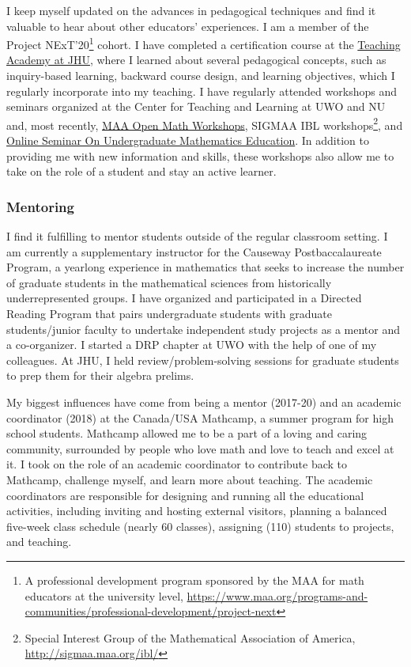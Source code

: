 \documentclass[
]{report}
\begin{document}
I keep myself updated on the advances in pedagogical techniques and find it valuable to hear about other educators' experiences. I am a member of the Project NExT'20\footnote{A professional development program sponsored by the MAA for math educators at the university level, \url{https://www.maa.org/programs-and-communities/professional-development/project-next}} cohort. I have completed a certification course at the \href{https://ctei.jhu.edu/teaching-academy}{Teaching Academy at JHU}, where I learned about several pedagogical concepts, such as inquiry-based learning, backward course design, and learning objectives, which I regularly incorporate into my teaching. I have regularly attended workshops and seminars organized at the Center for Teaching and Learning at UWO and NU and, most recently, \href{https://www.maa.org/programs-and-communities/professional-development/open-math}{MAA Open Math Workshops}, SIGMAA IBL workshops\footnote{Special Interest Group of the Mathematical Association of America, \url{http://sigmaa.maa.org/ibl/}}, and \href{https://olsume.org/}{Online Seminar On Undergraduate Mathematics Education}.
In addition to providing me with new information and skills, these workshops also allow me to take on the role of a student and stay an active learner.

\hypertarget{mentoring}{%
\subsubsection*{Mentoring}\label{mentoring}}


I find it fulfilling to mentor students outside of the regular classroom setting.
I am currently a supplementary instructor for the Causeway Postbaccalaureate Program, a yearlong experience in mathematics that seeks to increase the number of graduate students in the mathematical sciences from historically underrepresented groups. I have organized and participated in a Directed Reading Program that pairs undergraduate students with graduate students/junior faculty to undertake independent study projects as a mentor and a co-organizer. I started a DRP chapter at UWO with the help of one of my colleagues. At JHU, I held review/problem-solving sessions for graduate students to prep them for their algebra prelims.

My biggest influences have come from being a mentor (2017-20) and an academic coordinator (2018) at the Canada/USA Mathcamp, a summer program for high school students. Mathcamp allowed me to be a part of a loving and caring community, surrounded by people who love math and love to teach and excel at it. I took on the role of an academic coordinator to contribute back to Mathcamp, challenge myself, and learn more about teaching. The academic coordinators are responsible for designing and running all the educational activities, including inviting and hosting external visitors, planning a balanced five-week class schedule (nearly 60 classes), assigning (110) students to projects, and teaching.
\end{document}
